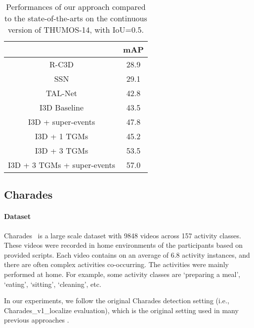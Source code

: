 \documentclass{article}
\begin{document}
\begin{table}
\caption{Performances of our approach compared to the state-of-the-arts on the continuous version of THUMOS-14, with IoU=0.5.}
\label{tab:thumos}
\centering
\begin{tabular}{c|c}
\toprule
 & mAP \\
\midrule
R-C3D \cite{xu2017r}                                 &  28.9 \\
SSN \cite{zhao2017temporal} & 29.1 \\
TAL-Net \cite{chao2018rethinking} & 42.8 \\
I3D Baseline & 43.5 \\
I3D + super-events\citep{piergiovanni2018super}                   & 47.8 \\
I3D + 1 TGMs                                   & 45.2  \\
I3D + 3 TGMs                                   & 53.5 \\
I3D + 3 TGMs + super-events                     &  57.0 \\
\bottomrule
\end{tabular}
\end{table}



\subsection{Charades}

\vspace{-3pt}
\paragraph{Dataset} Charades~\citep{sigurdsson2016hollywood} is a large scale dataset with 9848 videos across 157 activity classes. These videos were recorded in home environments of the participants based on provided scripts. Each video contains on an average of 6.8 activity instances, and there are often complex activities co-occurring. The activities were mainly performed at home. For example, some activity classes are `preparing a meal', `eating', `sitting', `cleaning', etc. 

In our experiments, we follow the original Charades detection setting (i.e., Charades\_v1\_localize evaluation), which is the original setting used in many previous approaches \citep{sigurdsson2016asynchronous,piergiovanni2018super}. 

\vspace{-4pt}
\end{document}
